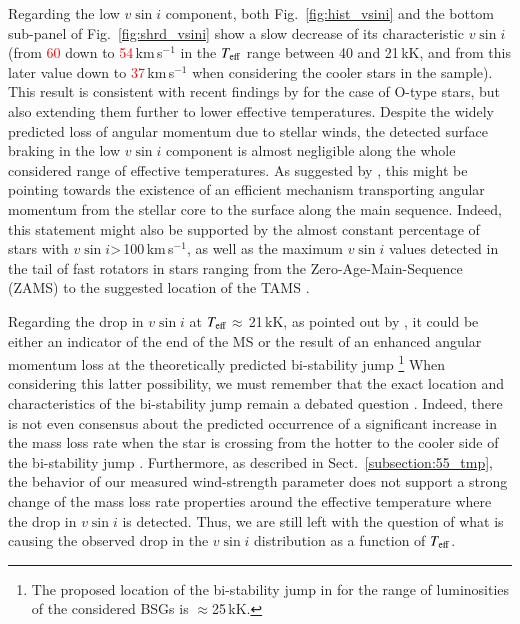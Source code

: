 \documentclass{aa}
\newcommand{\vsini}{\mbox{$v\sin i$}\xspace}
\newcommand{\Teff}{\mbox{$T_{\rm eff}$}\xspace}
\newcommand{\kms}{\,\mbox{km\,s$^{-1}$}\xspace}
\newcommand{\num}[1]{\textcolor{red}{#1}}
\begin{document}
Regarding the low \vsini component, both Fig.~\ref{fig:hist_vsini} and the bottom sub-panel of Fig.~\ref{fig:shrd_vsini} show a slow decrease of its characteristic \vsini (from \num{60} down to \num{54}\kms in the \Teff range between 40 and 21\,kK, and from this later value down to \num{37}\kms when considering the cooler stars in the sample). This result is consistent with recent findings by \citet{holgado22} for the case of O-type stars, but also extending them further to lower effective temperatures. Despite the widely predicted loss of angular momentum due to stellar winds, the detected surface braking in the low \vsini component is almost negligible along the whole considered range of effective temperatures. As suggested by \citet{holgado22}, this might be pointing towards the existence of an efficient mechanism transporting angular momentum from the stellar core to the surface along the main sequence. Indeed, this statement might also be supported by the almost constant percentage of stars with \vsini>\,100\kms, as well as the maximum \vsini values detected in the tail of fast rotators in stars ranging from the Zero-Age-Main-Sequence (ZAMS) to the suggested location of the TAMS \citep[see][and Sect.~\ref{subsection:51_tmp}]{holgado22}.

Regarding the drop in \vsini at \Teff$\approx$\,21\,kK, as pointed out by \citet{vink10}, it could be either an indicator of the end of the MS or the result of an enhanced angular momentum loss at the theoretically predicted bi-stability jump \citep{pauldrach90, vink99, vink00}\footnote{The proposed location of the bi-stability jump in \citet{vink00} for the range of luminosities of the considered BSGs is $\approx$25\,kK.} When considering this latter possibility, we must remember that the exact location and characteristics of the bi-stability jump remain a debated question \citep[see][]{petrov16, krticka23}. Indeed, there is not even consensus about the predicted occurrence of a significant increase in the mass loss rate when the star is crossing from the hotter to the cooler side of the bi-stability jump \citep{bjorklund21, bjorklund23}. Furthermore, as described in Sect.~\ref{subsection:55_tmp}, the behavior of our measured wind-strength parameter does not support a strong change of the mass loss rate properties around the effective temperature where the drop in \vsini is detected. Thus, we are still left with the question of what is causing the observed drop in the \vsini distribution as a function of \Teff.


\end{document}
